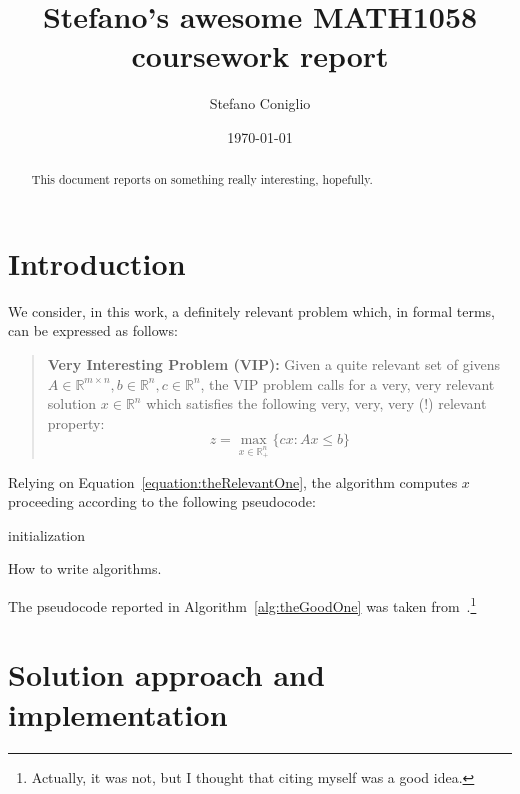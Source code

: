 \documentclass[a4paper]{article}
\title{Stefano's awesome MATH1058 coursework report}
\author{Stefano Coniglio}
\date{\today}
\numberwithin{equation}{section} %
\begin{document}
\maketitle

\begin{abstract}
  This document reports on something really interesting, hopefully.
\end{abstract}

\section{Introduction}
\label{sec:intro}

We consider, in this work, a definitely relevant problem which, in formal terms, can be expressed as follows:
%
\begin{quote}
  {\bf Very Interesting Problem (VIP):} Given a quite relevant set of givens $A \in \mathbb{R}^{m \times n}, b \in \mathbb{R}^n, c \in \mathbb{R}^n$, the VIP problem calls for a very, very relevant solution $x \in \mathbb{R}^n$ which satisfies the following very, very, very (!) relevant property:
  \begin{equation}\label{equation:theRelevantOne}
    z = \max_{x \in \mathbb{R}^n_+} \{cx: Ax \leq b\}
  \end{equation}
\end{quote}

Relying on Equation~\eqref{equation:theRelevantOne}, the algorithm computes $x$ proceeding according to the following pseudocode:

\begin{algorithm}[H]\label{alg:theGoodOne}
 initialization\;
 \caption{How to write algorithms.}
\end{algorithm}

The pseudocode reported in Algorithm~\ref{alg:theGoodOne} was taken from~\cite{coniglio}.\footnote{Actually, it was not, but I thought that citing myself was a good idea.}

\section{Solution approach and implementation}
\end{document}

